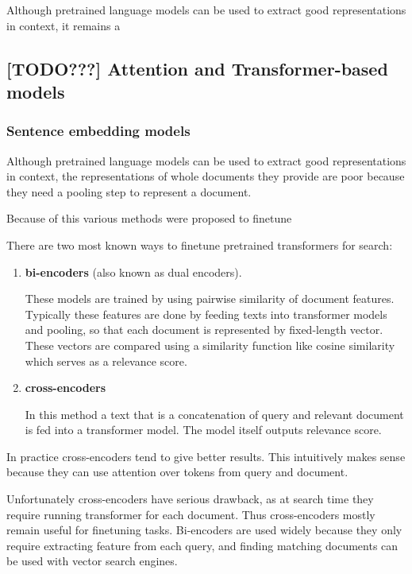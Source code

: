 \documentclass[11pt]{report}
\begin{document}
Although pretrained language models can be used to extract good representations in context, it remains a 

\subsection{[TODO???] Attention and Transformer-based models}

\subsubsection{Sentence embedding models}

Although pretrained language models can be used to extract good representations in context, the representations of whole documents they provide are poor because they need a pooling step to represent a document.

Because of this various methods were proposed to finetune 

There are two most known ways to finetune pretrained transformers for search:

\begin{enumerate}
    \item \textbf{bi-encoders} (also known as dual encoders).
    
    These models are trained by using pairwise similarity of document features. Typically these features are done by feeding texts into transformer models and pooling, so that each document is represented by fixed-length vector. These vectors are compared using a similarity function like cosine similarity which serves as a relevance score.
    
    \item  \textbf{cross-encoders}
    
    In this method a text that is a concatenation of query and relevant document is fed into a transformer model. The model itself outputs relevance score.
\end{enumerate}

In practice cross-encoders tend to give better results. This intuitively makes sense because they can use attention over tokens from query and document. 

Unfortunately cross-encoders have serious drawback, as at search time they require running transformer for each document. Thus cross-encoders mostly remain useful for finetuning tasks. Bi-encoders are used widely because they only require extracting feature from each query, and finding matching documents can be used with vector search engines.
\end{document}
